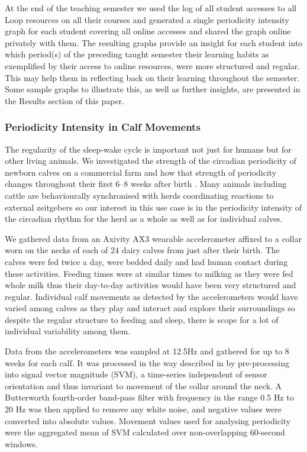 \documentclass[preprints,article,accept,pdftex,moreauthors]{Definitions/mdpi}
\begin{document}
At the end of the teaching semester we used the log of all student accesses to all Loop resources on all their courses and generated a single periodicity intensity graph for each student covering all {online} accesses and shared the graph online privately  with them.  The resulting graphs provide{} an insight for each student into which period(s) of the preceding taught semester their learning habits as exemplified by their access to online resources, were more structured and regular.  This may help them in reflecting back on their learning throughout the semester{.}    Some sample graphs to illustrate this, as well as further insights, are presented in the Results section of this paper.


\subsubsection{Periodicity Intensity in Calf Movements}

The regularity of the sleep-wake cycle is important not just for humans but for other living animals. We  investigated the {strength of the} circadian periodicity of newborn calves on a commercial farm and how th{at} strength of  periodicity changes throughout their first 6–8 weeks after birth \cite{rhodes2022periodicity}.  Many animals including cattle are behaviourally synchronised with herds coordinating reactions to external zeitgebers \cite{conradt2003group} so our interest in this use case
is in the periodicity intensity of the circadian rhythm for the herd as a whole as well as for individual calves.

We gathered data from an Axivity AX3 wearable accelerometer \cite{de2021comparison} affixed to a collar worn on the necks of each of 24 dairy calves from just after their birth. The calves were fed twice a day, were bedded daily and had human contact during these activities. Feeding times were at similar times to milking as they were fed whole milk  thus their day-to-day activities would have been very structured and regular. Individual calf movements as detected by the accelerometers would have varied among calves {as} they play and interact and explore their surroundings so despite the regular structure to feeding and sleep, there is scope for a lot of individual variability among them. 

Data from the accelerometers was sampled at 12.5Hz and  gathered for up to  8 weeks for each calf.  It was processed in the way described in \cite{riaboff2019evaluation} by pre-processing  into signal vector magnitude (SVM), a time-series independent of  sensor orientation and thus invariant to  movement of the collar around the neck.  A Butterworth fourth-order band-pass filter \cite{fridolfsson2019effects} with frequency in the range 0.5 Hz {to} 20 Hz was then applied to remove any white noise, and negative values were converted into absolute values.  Movement values used for analysing periodicity were the aggregated mean of SVM calculated over non-overlapping 60-second windows.
\end{document}
